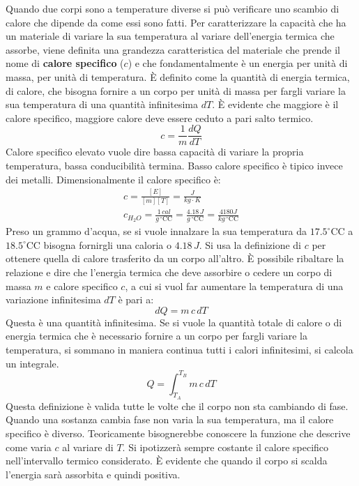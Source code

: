 \documentclass[10pt,a4paper]{book}
\renewcommand{\degree}{^\circ\text{C}} %
\begin{document}
Quando due corpi sono a temperature diverse si può verificare uno scambio di calore che dipende da come essi sono fatti. Per caratterizzare la capacità che ha un materiale di variare la sua temperatura al variare dell'energia termica che assorbe, viene definita una grandezza caratteristica del materiale che prende il nome di \textbf{calore specifico} ($c$) e che fondamentalmente è un energia per unità di massa, per unità di temperatura. È definito come la quantità di energia termica, di calore, che bisogna fornire a un corpo per unità di massa per fargli variare la sua temperatura di una quantità infinitesima $dT$. È evidente che maggiore è il calore specifico, maggiore calore deve essere ceduto a pari salto termico.
\[
	c = \frac{1}{m} \frac{dQ}{dT}
\]
Calore specifico elevato vuole dire bassa capacità di variare la propria temperatura, bassa conducibilità termina. Basso calore specifico è tipico invece dei metalli. Dimensionalmente il calore specifico è:
\begin{gather*}
	c = \frac{[E]}{[m][T]} = \frac{J}{kg\cdot K} \\
	c_{H_2 O} = \frac{1\,cal }{g\, \degree \text{C} } = \frac{4.18 \, J}{g\, \degree \text{C}} = \frac{4180J}{kg\, \degree \text{C}}
\end{gather*}
Preso un grammo d'acqua, se si vuole innalzare la sua temperatura da $17.5 \degree \text{C}$ a $18.5 \degree \text{C}$ bisogna fornirgli una caloria o $4.18 \, J$.
Si usa la definizione di $c$ per ottenere quella di calore trasferito da un corpo all'altro. È possibile ribaltare la relazione e dire che l'energia termica che deve assorbire o cedere un corpo di massa $m$ e calore specifico $c$, a cui si vuol far aumentare la temperatura di una variazione infinitesima $dT$ è pari a:
\[
	dQ = m\,c\,dT
\]
Questa è una quantità infinitesima. Se si vuole la quantità totale di calore o di energia termica che è necessario fornire a un corpo per fargli variare la temperatura, si sommano in maniera continua tutti i calori infinitesimi, si calcola un integrale.
\[
	Q = \int_{T_A}^{T_B} m\,c\,dT
\]
Questa definizione è valida tutte le volte che il corpo non sta cambiando di fase. Quando una sostanza cambia fase non varia la sua temperatura, ma il calore specifico è diverso. Teoricamente bisognerebbe conoscere la funzione che descrive come varia $c$ al variare di $T$. Si ipotizzerà sempre costante il calore specifico nell'intervallo termico considerato. È evidente che quando il corpo si scalda l'energia sarà assorbita e quindi positiva.
\end{document}

